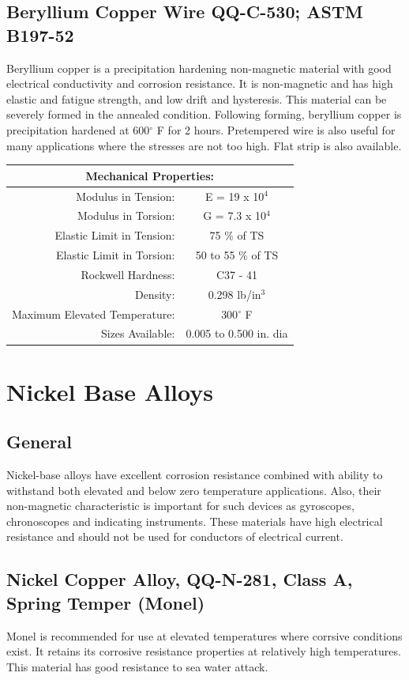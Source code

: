 \documentclass[10pt]{article}
\begin{document}
\clearpage
\subsection{Beryllium Copper Wire QQ-C-530; ASTM B197-52} %
Beryllium copper is a precipitation hardening non-magnetic material with good electrical conductivity and corrosion resistance. 
It is non-magnetic and has high elastic and fatigue strength, and low drift and hysteresis.
This material can be severely formed in the annealed condition.
Following forming, beryllium copper is precipitation hardened at 600$^\circ$ F for 2 hours.
Pretempered wire is also useful for many applications where the stresses are not too high.
Flat strip is also available.
\begin{center}
\begin{tabular}{ r c }
\multicolumn{2}{c}{Mechanical Properties:} \\
\hline
Modulus in Tension: & E = 19 x 10$^4$ \\  
Modulus in Torsion: & G = 7.3 x 10$^4$ \\
Elastic Limit in Tension: & 75 \% of TS \\  
Elastic Limit in Torsion: & 50 to 55 \% of TS \\
Rockwell Hardness: & C37 - 41 \\
Density: & 0.298 lb/in$^3$ \\
Maximum Elevated Temperature: & 300$^\circ$ F \\
Sizes Available: & 0.005 to 0.500 in. dia \\
\hline
\end{tabular}
\end{center}

\clearpage
\section{Nickel Base Alloys} %
\subsection{General} %
Nickel-base alloys have excellent corrosion resistance combined with ability to withstand both elevated and below zero temperature applications.
Also, their non-magnetic characteristic is important for such devices as gyroscopes, chronoscopes and indicating instruments.
These materials have high electrical resistance and should not be used for conductors of electrical current.

\subsection{Nickel Copper Alloy, QQ-N-281, Class A, Spring Temper (Monel)} %
Monel is recommended for use at elevated temperatures where corrsive conditions exist. 
It retains its corrosive resistance properties at relatively high temperatures. 
This material has good resistance to sea water attack.
\end{document}
